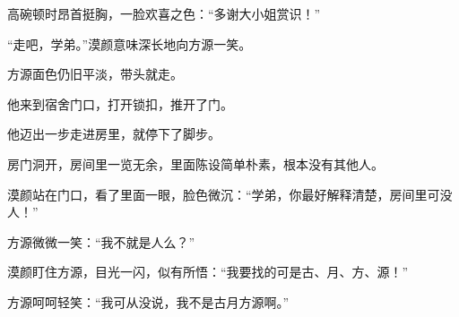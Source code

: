 \begin{this_body}
高碗顿时昂首挺胸，一脸欢喜之色：“多谢大小姐赏识！”

“走吧，学弟。”漠颜意味深长地向方源一笑。

方源面色仍旧平淡，带头就走。

他来到宿舍门口，打开锁扣，推开了门。

他迈出一步走进房里，就停下了脚步。

房门洞开，房间里一览无余，里面陈设简单朴素，根本没有其他人。

漠颜站在门口，看了里面一眼，脸色微沉：“学弟，你最好解释清楚，房间里可没人！”

方源微微一笑：“我不就是人么？”

漠颜盯住方源，目光一闪，似有所悟：“我要找的可是古、月、方、源！”

方源呵呵轻笑：“我可从没说，我不是古月方源啊。”

\end{this_body}


